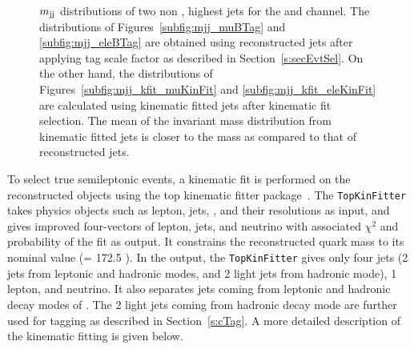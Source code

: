\begin{figure}
    \caption{$m_\text{jj}$ distributions of two non \PQb, highest \pt jets for the 
     \mujets and \ejets channel. The distributions of 
     Figures~\ref{subfig:mjj_muBTag} and \ref{subfig:mjj_eleBTag} are obtained 
     using reconstructed jets after applying \PQb tag scale factor as described 
     in Section~\ref{s:secEvtSel}. On the other hand, the distributions of 
     Figures~\ref{subfig:mjj_kfit_muKinFit} and \ref{subfig:mjj_kfit_eleKinFit} 
     are calculated using kinematic fitted jets after kinematic fit selection. 
     The mean of the invariant mass distribution from kinematic fitted jets 
     is closer to the \PW mass as compared to that of reconstructed jets.}
    \label{fig:mjjBTagKinFit}
\end{figure}

To select true semileptonic \ttbar events, a kinematic fit is performed on the 
reconstructed objects using the top kinematic fitter package~\cite{DHondt:2006iej}. 
The \verb|TopKinFitter| takes physics objects such as lepton, jets, \MET, and their 
resolutions as input, and gives improved four-vectors of lepton, jets, and neutrino with 
associated $\chi^2$ and probability of the fit as output. It constrains the reconstructed 
\PQt quark mass to its nominal value (\mt = 172.5 \GeV). In the output, the 
\verb|TopKinFitter| gives only four jets (2 \PQb jets from leptonic and hadronic modes, and 2 
light jets from hadronic mode), 1 lepton, and neutrino. It also separates jets coming from
leptonic and hadronic decay modes of \ttbar. The 2 light jets coming from hadronic 
decay mode are further used for \PQc tagging as described in Section~\ref{s:cTag}. 
A more detailed description of the kinematic fitting is given below.

